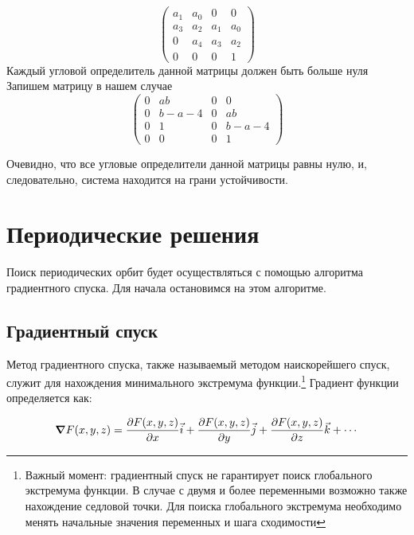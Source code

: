 \documentclass[12pt, a4paper]{article}
\begin{document}
\begin{equation}
    \label{gurwits}
    \begin{pmatrix}
        a_1 & a_0 & 0 & 0\\
        a_3 & a_2 & a_1 & a_0\\
        0 & a_4 & a_3 & a_2\\
        0 & 0 & 0 & 1
    \end{pmatrix}
\end{equation}
Каждый угловой определитель данной матрицы должен быть больше нуля\\
Запишем матрицу в нашем случае
\begin{equation*}
    \begin{pmatrix}
        0 & ab & 0 & 0\\
        0 & b - a - 4 & 0 & ab\\
        0 & 1 & 0 & b - a - 4\\
        0 & 0 & 0 & 1
    \end{pmatrix}
\end{equation*}

Очевидно, что все угловые определители данной матрицы равны нулю, и, следовательно, система находится на грани устойчивости.

\section{Периодические решения}

Поиск периодических орбит будет осуществляться с помощью алгоритма градиентного спуска. 
Для начала остановимся на этом алгоритме.

\subsection{Градиентный спуск}

 Метод градиентного спуска, также называемый методом наискорейшего спуск, служит для нахождения минимального экстремума функции.\footnote{Важный момент: градиентный спуск не гарантирует поиск глобального экстремума функции. В случае с двумя и более переменными возможно также нахождение седловой точки. Для поиска глобального экстремума необходимо менять начальные значения переменных и шага сходимости} 
 Градиент функции определяется как:

 \begin{equation*}
     \grad F(x, y, z) = \frac{\partial F(x, y, z)}{\partial x} \vec{i} + \frac{\partial F(x, y, z)}{\partial y} \vec{j}+ \frac{\partial F(x, y, z)}{\partial z} \vec{k} + \cdots
 \end{equation*}
\end{document}
